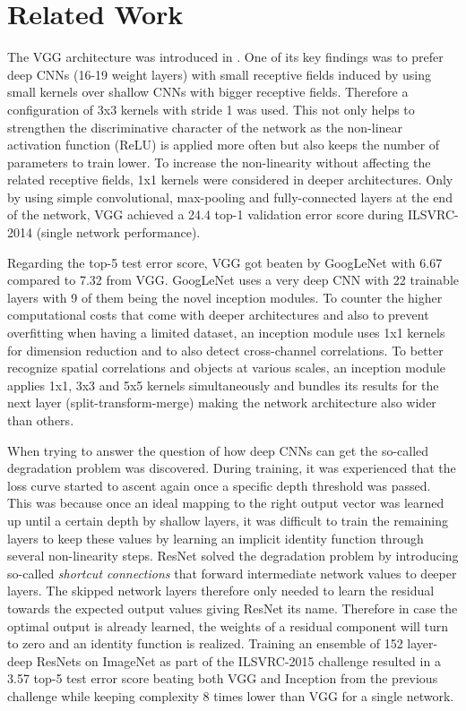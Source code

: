 \section{Related Work} \label{related_work}

The VGG architecture was introduced in \cite{KarenSimonyan.2014}. One of its key findings was to prefer deep CNNs (16-19 weight layers) with small receptive fields induced by using small kernels over shallow CNNs with bigger receptive fields. Therefore a configuration of 3x3 kernels with stride 1 was used. This not only helps to strengthen the discriminative character of the network as the non-linear activation function (ReLU) is applied more often but also keeps the number of parameters to train lower. To increase the non-linearity without affecting the related receptive fields, 1x1 kernels were considered in deeper architectures. Only by using simple convolutional, max-pooling and fully-connected layers at the end of the network, VGG achieved a 24.4 top-1 validation error score during ILSVRC-2014 (single network performance). \cite{KarenSimonyan.2014}

Regarding the top-5 test error score, VGG got beaten by GoogLeNet with 6.67 compared to 7.32 from VGG. GoogLeNet uses a very deep CNN with 22 trainable layers with 9 of them being the novel inception modules. To counter the higher computational costs that come with deeper architectures and also to prevent overfitting when having a limited dataset, an inception module uses 1x1 kernels for dimension reduction and to also detect cross-channel correlations. To better recognize spatial correlations and objects at various scales, an inception module applies 1x1, 3x3 and 5x5 kernels simultaneously and bundles its results for the next layer (split-transform-merge) making the network architecture also wider than others. \cite{ChristianSzegedy.2014}

When trying to answer the question of how deep CNNs can get the so-called degradation problem was discovered. During training, it was experienced that the loss curve started to ascent again once a specific depth threshold was passed. This was because once an ideal mapping to the right output vector was learned up until a certain depth by shallow layers, it was difficult to train the remaining layers to keep these values by learning an implicit identity function through several non-linearity steps. ResNet solved the degradation problem by introducing so-called \textit{shortcut connections} that forward intermediate network values to deeper layers. The skipped network layers therefore only needed to learn the residual towards the expected output values giving ResNet its name. Therefore in case the optimal output is already learned, the weights of a residual component will turn to zero and an identity function is realized. Training an ensemble of 152 layer-deep ResNets on ImageNet as part of the ILSVRC-2015 challenge resulted in a 3.57 top-5 test error score beating both VGG and Inception from the previous challenge while keeping complexity 8 times lower than VGG for a single network. \cite{KaimingHe.2015}

